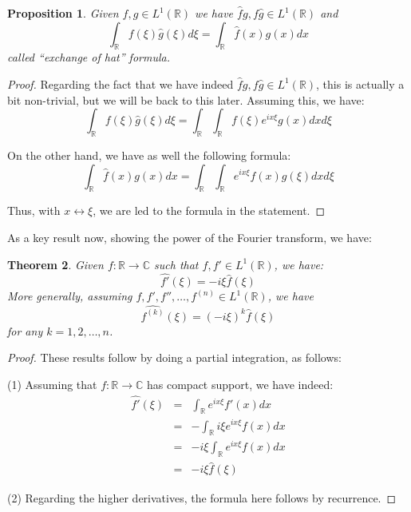 \documentclass[12pt]{amsbook}
\newtheorem{theorem}{Theorem}[chapter]
\newtheorem{proposition}[theorem]{Proposition}
\begin{document}

\begin{proposition}
Given $f,g\in L^1(\mathbb R)$ we have $\widehat{f}g,f\widehat{g}\in L^1(\mathbb R)$ and
$$\int_\mathbb R f(\xi)\widehat{g}(\xi)d\xi=\int_\mathbb R\widehat{f}(x)g(x)dx$$
called ``exchange of hat'' formula.
\end{proposition}

\begin{proof}
Regarding the fact that we have indeed $\widehat{f}g,f\widehat{g}\in L^1(\mathbb R)$, this is actually a bit non-trivial, but we will be back to this later. Assuming this, we have:
$$\int_\mathbb R f(\xi)\widehat{g}(\xi)d\xi=\int_\mathbb R\int_\mathbb R f(\xi)e^{ix\xi}g(x)dxd\xi$$

On the other hand, we have as well the following formula:
$$\int_\mathbb R\widehat{f}(x)g(x)dx=\int_\mathbb R\int_\mathbb R e^{ix\xi}f(x)g(\xi)dxd\xi$$

Thus, with $x\leftrightarrow\xi$, we are led to the formula in the statement.
\end{proof}

As a key result now, showing the power of the Fourier transform, we have:

\begin{theorem}
Given $f:\mathbb R\to\mathbb C$ such that $f,f'\in L^1(\mathbb R)$, we have:
$$\widehat{f'}(\xi)=-i\xi\widehat{f}(\xi)$$
More generally, assuming $f,f',f'',\ldots,f^{(n)}\in L^1(\mathbb R)$, we have
$$\widehat{f^{(k)}}(\xi)=(-i\xi)^k\widehat{f}(\xi)$$
for any $k=1,2,\ldots,n$.
\end{theorem}

\begin{proof}
These results follow by doing a partial integration, as follows:

\medskip

(1) Assuming that $f:\mathbb R\to\mathbb C$ has compact support, we have indeed:
\begin{eqnarray*}
\widehat{f'}(\xi)
&=&\int_\mathbb R e^{ix\xi}f'(x)dx\\
&=&-\int_\mathbb R i\xi e^{ix\xi}f(x)dx\\
&=&-i\xi\int_\mathbb R e^{ix\xi}f(x)dx\\
&=&-i\xi\widehat{f}(\xi)
\end{eqnarray*}

(2) Regarding the higher derivatives, the formula here follows by recurrence.
\end{proof}
\end{document}
